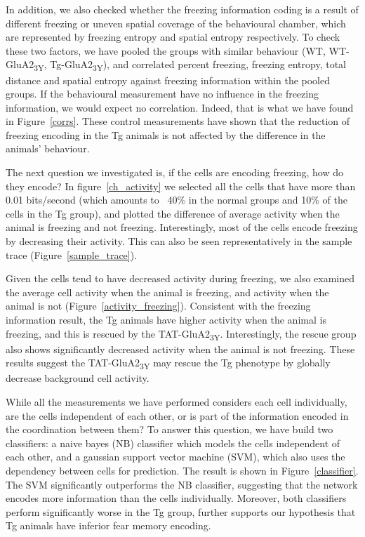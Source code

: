 In addition, we also checked whether the freezing information coding is a result of different freezing or uneven spatial coverage of the behavioural chamber, which are represented by freezing entropy and spatial entropy respectively. To check these two factors, we have pooled the groups with similar behaviour (WT, WT-GluA2\textsubscript{3Y}, Tg-GluA2\textsubscript{3Y}), and correlated percent freezing, freezing entropy, total distance and spatial entropy against freezing information within the pooled groups. If the behavioural measurement have no influence in the freezing information, we would expect no correlation. Indeed, that is what we have found in Figure~\ref{corrs}. These control measurements have shown that the reduction of freezing encoding in the Tg animals is not affected by the difference in the animals' behaviour.

The next question we investigated is, if the cells are encoding freezing, how do they encode? In figure~\ref{ch_activity} we selected all the cells that have more than 0.01 bits/second (which amounts to ~40\% in the normal groups and 10\% of the cells in the Tg group), and plotted the difference of average activity when the animal is freezing and not freezing. Interestingly, most of the cells encode freezing by decreasing their activity. This can also be seen representatively in the sample trace (Figure~\ref{sample_trace}).

Given the cells tend to have decreased activity during freezing, we also examined the average cell activity when the animal is freezing, and activity when the animal is not (Figure~\ref{activity_freezing}). Consistent with the freezing information result, the Tg animals have higher activity when the animal is freezing, and this is rescued by the TAT-GluA2\textsubscript{3Y}. Interestingly, the rescue group also shows significantly decreased activity when the animal is not freezing. These results suggest the TAT-GluA2\textsubscript{3Y} may rescue the Tg phenotype by globally decrease background cell activity.


While all the measurements we have performed considers each cell individually, are the cells independent of each other, or is part of the information encoded in the coordination between them? To answer this question, we have build two classifiers: a naive bayes (NB) classifier which models the cells independent of each other, and a gaussian support vector machine (SVM), which also uses the dependency between cells for prediction. The result is shown in Figure~\ref{classifier}. The SVM significantly outperforms the NB classifier, suggesting that the network encodes more information than the cells individually. Moreover, both classifiers perform significantly worse in the Tg group, further supports our hypothesis that Tg animals have inferior fear memory encoding.

